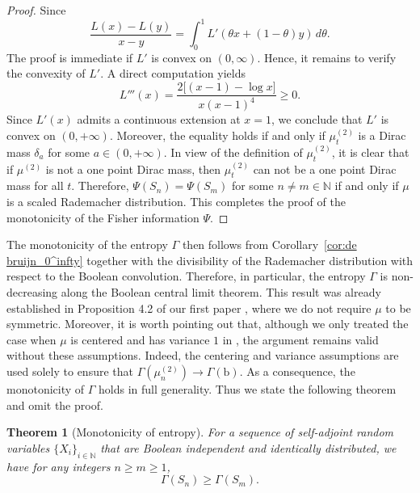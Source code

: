 \documentclass[10pt, reqno]{amsart}
\numberwithin{equation}{section}
\theoremstyle{definition}
\theoremstyle{plain}
\newtheorem{theorem}[definition]{Theorem}
\theoremstyle{remark}
\newcommand{\N}{\mathbb{N}}
\newcommand{\1}{\mathbbm{1}}
\begin{document}
\begin{proof}
        Since
        \begin{equation*}
            \frac{L(x)-L(y)}{x-y} =\int_0^1 L'(\theta x+(1-\theta)y)\,d\theta.
        \end{equation*}
        The proof is immediate if $L'$ is convex on $(0,\infty)$. Hence, it remains to verify the convexity of $L'$. A direct computation yields
        \begin{equation*}
            L'''(x)=\frac{2\bigl[(x-1)-\log x\bigr]}{x(x-1)^4}\ge 0.
        \end{equation*}
        Since $L'(x)$ admits a continuous extension at $x=1$, we conclude that $L'$ is convex on $(0,+\infty)$. Moreover, the equality holds if and only if $\mu^{(2)}_t$ is a Dirac mass $\delta_a$ for some $a\in(0,+\infty)$. In view of the definition of $\mu^{(2)}_t$, it is clear that if $\mu^{(2)}$ is not a one point Dirac mass, then $\mu^{(2)}_t$ can not be a one point Dirac mass for all $t$. Therefore, $\Psi(S_n)=\Psi(S_m)$ for some $n\ne m\in \N$ if and only if $\mu$ is a scaled Rademacher distribution. This completes the proof of the monotonicity of the Fisher information $\Psi$.
    \end{proof}
    The monotonicity of the entropy $\Gamma$ then follows from Corollary~\ref{cor:de bruijn_0^infty} together with the divisibility of the Rademacher distribution with respect to the Boolean convolution. Therefore, in particular, the entropy $\Gamma$ is non-decreasing along the Boolean central limit theorem. This result was already established in Proposition 4.2 of our first paper \cite{pan2025entropy}, where we do not require $\mu$ to be symmetric. Moreover, it is worth pointing out that, although we only treated the case when $\mu$ is centered and has variance $1$ in \cite{pan2025entropy}, the argument remains valid without these assumptions. Indeed, the centering and variance assumptions are used solely to ensure that $\Gamma(\mu^{(2)}_n)\longrightarrow \Gamma(\mathbb{\mathrm{b}})$. As a consequence, the monotonicity of $\Gamma$ holds in full generality. Thus we state the following theorem and omit the proof. 
    \begin{theorem}[Monotonicity of entropy]
        For a sequence of self-adjoint random variables $\{X_i\}_{i\in \N}$ that are Boolean independent and identically distributed, we have for any integers $n\ge m\ge 1$,
        \begin{equation}
            \Gamma(S_n)\ge \Gamma(S_m).
        \end{equation}
    \end{theorem}
\end{document}
